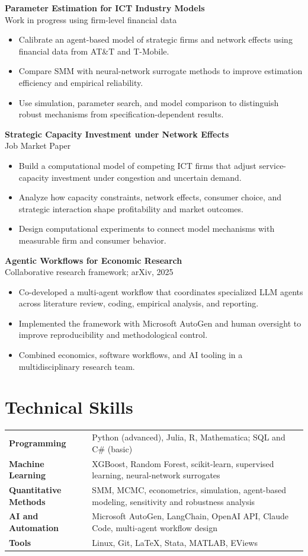 \documentclass[a4paper,11pt]{article}
\newcommand{\project}[2]{%
  \textbf{#1}\\[-1pt]
  \textcolor{muted}{\small #2}\par
}
\begin{document}
\project{Parameter Estimation for ICT Industry Models}{Work in progress using firm-level financial data}
\begin{itemize}
  \item Calibrate an agent-based model of strategic firms and network effects using financial data from AT\&T and T-Mobile.
  \item Compare SMM with neural-network surrogate methods to improve estimation efficiency and empirical reliability.
  \item Use simulation, parameter search, and model comparison to distinguish robust mechanisms from specification-dependent results.
\end{itemize}

\project{Strategic Capacity Investment under Network Effects}{Job Market Paper}
\begin{itemize}
  \item Build a computational model of competing ICT firms that adjust service-capacity investment under congestion and uncertain demand.
  \item Analyze how capacity constraints, network effects, consumer choice, and strategic interaction shape profitability and market outcomes.
  \item Design computational experiments to connect model mechanisms with measurable firm and consumer behavior.
\end{itemize}

\project{Agentic Workflows for Economic Research}{Collaborative research framework; arXiv, 2025}
\begin{itemize}
  \item Co-developed a multi-agent workflow that coordinates specialized LLM agents across literature review, coding, empirical analysis, and reporting.
  \item Implemented the framework with Microsoft AutoGen and human oversight to improve reproducibility and methodological control.
  \item Combined economics, software workflows, and AI tooling in a multidisciplinary research team.
\end{itemize}

\section{Technical Skills}
\begin{tabularx}{\linewidth}{@{}>{\bfseries}p{3.25cm}X@{}}
Programming & Python (advanced), Julia, R, Mathematica; SQL and C\# (basic)\\
Machine Learning & XGBoost, Random Forest, scikit-learn, supervised learning, neural-network surrogates\\
Quantitative Methods & SMM, MCMC, econometrics, simulation, agent-based modeling, sensitivity and robustness analysis\\
AI and Automation & Microsoft AutoGen, LangChain, OpenAI API, Claude Code, multi-agent workflow design\\
Tools & Linux, Git, LaTeX, Stata, MATLAB, EViews\\
\end{tabularx}
\end{document}
